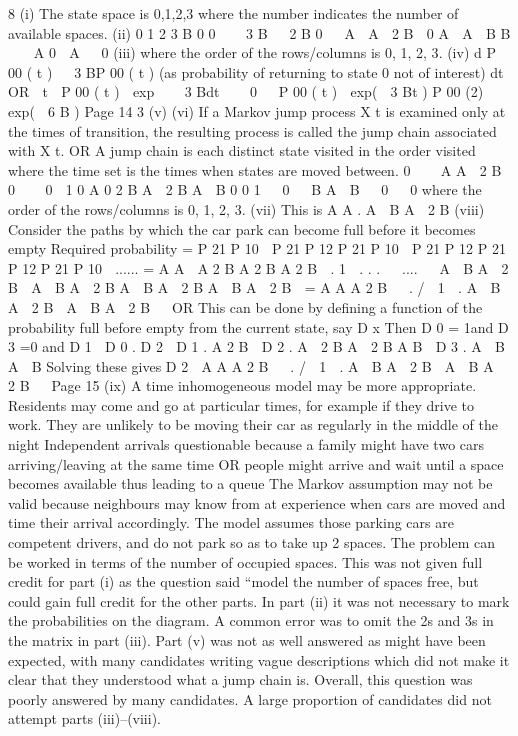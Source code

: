 \documentclass[a4paper,12pt]{article}
\begin{document}
8
(i)
The state space is {0,1,2,3} where the number indicates the number of available
spaces.
(ii)
0
1
2
3 B
0
0 
  3 B


2 B
0 
 A  A  2 B
 0
A
 A  B B 


A
0
 A 
 0
(iii)
where the order of the rows/columns is {0, 1, 2, 3}.
(iv)
d
P 00 ( t )   3 BP 00 ( t ) (as probability of returning to state 0 not of interest)
dt
OR
 t

P 00 ( t )  exp    3 Bdt 
  0
 
P 00 ( t )  exp(  3 Bt )
P 00 (2)  exp(  6 B )
Page 14
3%
(v)
(vi)
If a Markov jump process X t is examined only at the times of transition, the resulting
process is called the jump chain associated with X t.
OR
A jump chain is each distinct state visited in the order visited where the time set is the
times when states are moved between.
0


 A A  2 B

0

 
0

1
0
A
0
2 B
A  2 B
A  B
0
0
1


0 

B
A  B 

0  
0
where the order of the rows/columns is {0, 1, 2, 3}.
(vii)
This is
A
A
.
A  B A  2 B
(viii) Consider the paths by which the car park can become full before it becomes
empty
Required probability = P 21 P 10  P 21 P 12 P 21 P 10  P 21 P 12 P 21 P 12 P 21 P 10  ......
= A
A 
A
2 B
A
2 B
A
2 B

.
1 
.
.
.

 .... 

A  B A  2 B  A  B A  2 B A  B A  2 B A  B A  2 B

= A
A
A
2 B 

.
/  1 
.
A  B A  2 B  A  B A  2 B  
OR
This can be done by defining a function of the probability full before empty from the
current state, say D x
Then D 0 = 1and D 3 =0
and D 1  D 0 .
D 2  D 1 .
A
2 B
 D 2 .
A  2 B
A  2 B
A
B
 D 3 .
A  B
A  B
Solving these gives
D 2 
A
A
A
2 B 

.
/  1 
.
A  B A  2 B  A  B A  2 B  
Page 15%
(ix)
A time inhomogeneous model may be more appropriate.
Residents may come and go at particular times, for example if they drive to work.
They are unlikely to be moving their car as regularly in the middle of the night
Independent arrivals questionable because a family might have two cars arriving/leaving at the same time OR people might arrive and wait until a space
becomes available thus leading to a queue The Markov assumption may not be valid because neighbours may know from at
experience when cars are moved and time their arrival accordingly.
The model assumes those parking cars are competent drivers, and do not park so as to
take up 2 spaces.
The problem can be worked in terms of the number of occupied spaces. This was not given
full credit for part (i) as the question said “model the number of spaces free, but could gain
full credit for the other parts. In part (ii) it was not necessary to mark the probabilities on the
diagram. A common error was to omit the 2s and 3s in the matrix in part (iii). Part (v) was
not as well answered as might have been expected, with many candidates writing vague
descriptions which did not make it clear that they understood what a jump chain is.
Overall, this question was poorly answered by many candidates. A large proportion of
candidates did not attempt parts (iii)–(viii).
\end{document}
